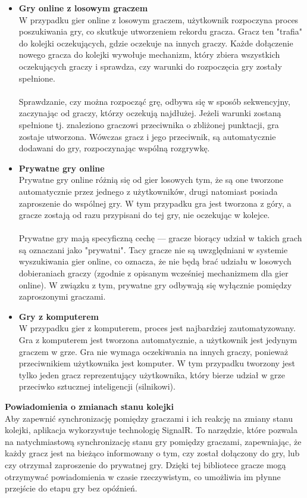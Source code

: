 \documentclass[12pt,a4paper]{article}
\begin{document}
\begin{itemize}
    \item \textbf{Gry online z losowym graczem}\\
    W przypadku gier online z losowym graczem, użytkownik rozpoczyna proces poszukiwania gry, co skutkuje utworzeniem rekordu gracza. Gracz ten "trafia" do kolejki oczekujących, gdzie oczekuje na innych graczy. Każde dołączenie nowego gracza do kolejki wywołuje mechanizm, który zbiera wszystkich oczekujących graczy i sprawdza, czy warunki do rozpoczęcia gry zostały spełnione.
    \\\\
    Sprawdzanie, czy można rozpocząć grę, odbywa się w sposób sekwencyjny, zaczynając od graczy, którzy oczekują najdłużej. Jeżeli warunki zostaną spełnione tj. znaleziono graczowi przeciwnika o zbliżonej punktacji, gra zostaje utworzona. Wówczas gracz i jego przeciwnik, są automatycznie dodawani do gry, rozpoczynając wspólną rozgrywkę.
    
    \item \textbf{Prywatne gry online}\\
    Prywatne gry online różnią się od gier losowych tym, że są one tworzone automatycznie przez jednego z użytkowników, drugi natomiast posiada zaproszenie do wspólnej gry. W tym przypadku gra jest tworzona z góry, a gracze zostają od razu przypisani do tej gry, nie oczekując w kolejce.
    \\\\
    Prywatne gry mają specyficzną cechę — gracze biorący udział w takich grach są oznaczani jako "prywatni". Tacy gracze nie są uwzględniani w systemie wyszukiwania gier online, co oznacza, że nie będą brać udziału w losowych dobieraniach graczy (zgodnie z opisanym wcześniej mechanizmem dla gier online). W związku z tym, prywatne gry odbywają się wyłącznie pomiędzy zaproszonymi graczami.

    \item \textbf{Gry z komputerem}\\
    W przypadku gier z komputerem, proces jest najbardziej zautomatyzowany. Gra z komputerem jest tworzona automatycznie, a użytkownik jest jedynym graczem w grze. Gra nie wymaga oczekiwania na innych graczy, ponieważ przeciwnikiem użytkownika jest komputer. W tym przypadku tworzony jest tylko jeden gracz reprezentujący użytkownika, który bierze udział w grze przeciwko sztucznej inteligencji (silnikowi).
\end{itemize}

\noindent \textbf{Powiadomienia o zmianach stanu kolejki}\\
Aby zapewnić synchronizację pomiędzy graczami i ich reakcję na zmiany stanu kolejki, aplikacja wykorzystuje technologię SignalR. To narzędzie, które pozwala na natychmiastową synchronizację stanu gry pomiędzy graczami, zapewniając, że każdy gracz jest na bieżąco informowany o tym, czy został dołączony do gry, lub czy otrzymał zaproszenie do prywatnej gry. Dzięki tej bibliotece gracze mogą otrzymywać powiadomienia w czasie rzeczywistym, co umożliwia im płynne przejście do etapu gry bez opóźnień.
\end{document}
